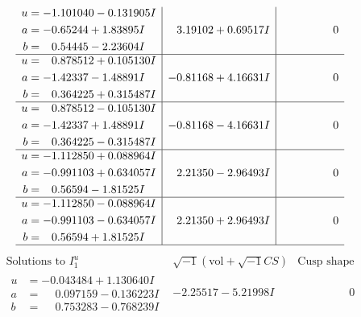 \documentclass[1p]{elsarticle_modified}
\theoremstyle{definition}
\newcommand{\I}{\sqrt{-1}}
\begin{document}
$$\begin{array}{c|c|c}
\begin{aligned}
u &= -1.101040 - 0.131905 I \\
a &= -0.65244 + 1.83895 I \\
b &= \phantom{-}0.54445 - 2.23604 I\end{aligned}
 & \phantom{-}3.19102 + 0.69517 I & \phantom{-0.000000 } 0 \\ \hline\begin{aligned}
u &= \phantom{-}0.878512 + 0.105130 I \\
a &= -1.42337 - 1.48891 I \\
b &= \phantom{-}0.364225 + 0.315487 I\end{aligned}
 & -0.81168 + 4.16631 I & \phantom{-0.000000 } 0 \\ \hline\begin{aligned}
u &= \phantom{-}0.878512 - 0.105130 I \\
a &= -1.42337 + 1.48891 I \\
b &= \phantom{-}0.364225 - 0.315487 I\end{aligned}
 & -0.81168 - 4.16631 I & \phantom{-0.000000 } 0 \\ \hline\begin{aligned}
u &= -1.112850 + 0.088964 I \\
a &= -0.991103 + 0.634057 I \\
b &= \phantom{-}0.56594 - 1.81525 I\end{aligned}
 & \phantom{-}2.21350 - 2.96493 I & \phantom{-0.000000 } 0 \\ \hline\begin{aligned}
u &= -1.112850 - 0.088964 I \\
a &= -0.991103 - 0.634057 I \\
b &= \phantom{-}0.56594 + 1.81525 I\end{aligned}
 & \phantom{-}2.21350 + 2.96493 I & \phantom{-0.000000 } 0\\
 \hline 
 \end{array}$$\newpage$$\begin{array}{c|c|c}  
\text{Solutions to }I^u_{1}& \I (\text{vol} + \sqrt{-1}CS) & \text{Cusp shape}\\
 \hline 
\begin{aligned}
u &= -0.043484 + 1.130640 I \\
a &= \phantom{-}0.097159 - 0.136223 I \\
b &= \phantom{-}0.753283 - 0.768239 I\end{aligned}
 & -2.25517 - 5.21998 I & \phantom{-0.000000 } 0 \\ \hline\begin{aligned}

\end{aligned}
\end{array}$$
\end{document}
